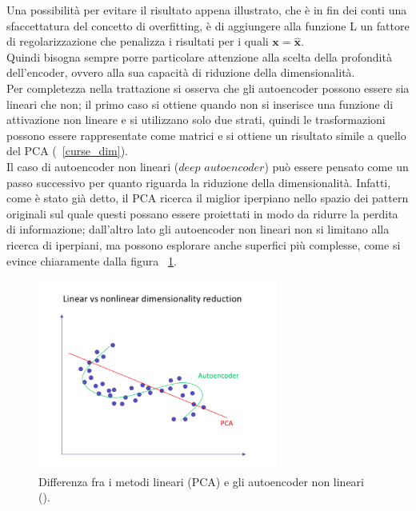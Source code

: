 Una possibilità per evitare il risultato appena illustrato, che è in fin dei conti una sfaccettatura del concetto di overfitting, è di aggiungere alla funzione L un fattore di regolarizzazione che penalizza i risultati per i quali $\textbf{x} = \hat{\textbf{x}}$. \\
Quindi bisogna sempre porre particolare attenzione alla scelta della profondità dell'encoder, ovvero alla sua capacità di riduzione della dimensionalità. \\
Per completezza nella trattazione si osserva che gli autoencoder possono essere sia lineari che non; il primo caso si ottiene quando non si inserisce una funzione di attivazione non lineare e si utilizzano solo due strati, quindi le trasformazioni possono essere rappresentate come matrici e si ottiene un risultato simile a quello del PCA (~\ref{curse_dim}). \\
Il caso di autoencoder non lineari ($\textit{deep autoencoder}$) può essere pensato come un passo successivo per quanto riguarda la riduzione della dimensionalità. Infatti, come è stato già detto, il PCA ricerca il miglior iperpiano nello spazio dei pattern originali sul quale questi possano essere proiettati in modo da ridurre la perdita di informazione; dall'altro lato gli autoencoder non lineari non si limitano alla ricerca di iperpiani, ma possono esplorare anche superfici più complesse, come si evince chiaramente dalla figura ~\ref{autoencoder_non_lineari}.

\begin{figure}[h!]
	\centering
	\includegraphics[width=0.70\textwidth]{figs/Autoencoder_non_lineari.png}
	\caption{Differenza fra i metodi lineari (PCA) e gli autoencoder non lineari (\cite{Autoencoders}).}
	\label{autoencoder_non_lineari}
\end{figure}


